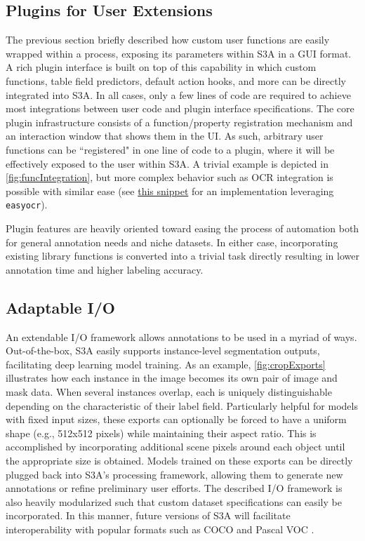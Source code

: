 \subsection{Plugins for User Extensions}\label{sec:plugins}
The previous section briefly described how custom user functions are easily wrapped within a process, exposing its parameters within S3A in a GUI format.
A rich plugin interface is built on top of this capability in which custom functions, table field predictors, default action hooks, and more can be directly integrated into S3A.
In all cases, only a few lines of code are required to achieve most integrations between user code and plugin interface specifications.
The core plugin infrastructure consists of a function/property registration mechanism and an interaction window that shows them in the UI.
As such, arbitrary user functions can be ``registered" in one line of code to a plugin, where it will be effectively exposed to the user within S3A.
A trivial example is depicted in \autoref{fig:funcIntegration}, but more complex behavior such as OCR integration is possible with similar ease (see \href{https://gitlab.com/s3a/s3a/-/snippets/2203628}{this snippet} for an implementation leveraging \texttt{easyocr}).

\makeFuncIntegrationFig

Plugin features are heavily oriented toward easing the process of automation both for general annotation needs and niche datasets.
In either case, incorporating existing library functions is converted into a trivial task directly resulting in lower annotation time and higher labeling accuracy.

\subsection{Adaptable I/O}
An extendable I/O framework allows annotations to be used in a myriad of ways.
Out-of-the-box, S3A easily supports instance-level segmentation outputs, facilitating deep learning model training.
As an example, \autoref{fig:cropExports} illustrates how each instance in the image becomes its own pair of image and mask data.
When several instances overlap, each is uniquely distinguishable depending on the characteristic of their label field.
Particularly helpful for models with fixed input sizes, these exports can optionally be forced to have a uniform shape (e.g., 512x512 pixels) while maintaining their aspect ratio.
This is accomplished by incorporating additional scene pixels around each object until the appropriate size is obtained.
Models trained on these exports can be directly plugged back into S3A's processing framework, allowing them to generate new annotations or refine preliminary user efforts.
The described I/O framework is also heavily modularized such that custom dataset specifications can easily be incorporated.
In this manner, future versions of S3A will facilitate interoperability with popular formats such as COCO and Pascal VOC \citep{lin_microsoft_2014,everingham_pascal_2010}.


